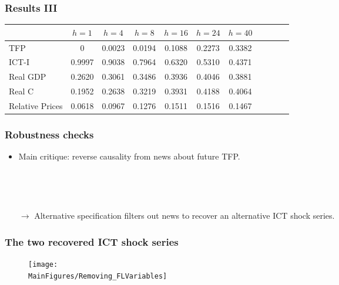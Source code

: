 \documentclass{beamer}
\def \MainFigures{../Draft_Summer2018/MainFigures}
\begin{document}
\begin{frame}
	\frametitle{Results III}
	
\begin{table}[h!]
 		\begin{center}
 \begin{tabular}{lcccccccccc}
\hline
 	& $h = 1$ & $h = 4$ & $h = 8$ & $h = 16$ & $h = 24$ & $h = 40$ \\
 	\hline
TFP &  0       &  0.0023  &  0.0194 &   0.1088 &   0.2273  &  0.3382 \\
ICT-I &  0.9997  &  0.9038  &  0.7964 &   0.6320 &   0.5310  &  0.4371 \\
Real GDP &  0.2620  &  0.3061  &  0.3486 &   0.3936 &   0.4046  &  0.3881 \\
Real C &  0.1952  &  0.2638  &  0.3219 &   0.3931 &   0.4188  &  0.4064 \\
Relative Prices &  0.0618  &  0.0967  &  0.1276 &   0.1511 &   0.1516  &  0.1467 \\	
\hline
 	\end{tabular}
  \label{table:vardec}
  \end{center}
 \end{table}


\end{frame}

\begin{frame}
	\frametitle{Robustness checks}
	\label{robustness_checks}
	
\begin{itemize}
\item Main critique: reverse causality from news about future TFP.

\

\

\item[$\rightarrow$] Alternative specification filters out news to recover an alternative ICT shock series. 

\hyperlink{controlling_news}{}	
\end{itemize}

\end{frame}

\begin{frame}
	\frametitle{The two recovered ICT shock series}
	
\begin{figure}[h!]
\texttt{[image: \\MainFigures/Removing\_FLVariables]}
\end{figure}	

\end{frame}
\end{document}
